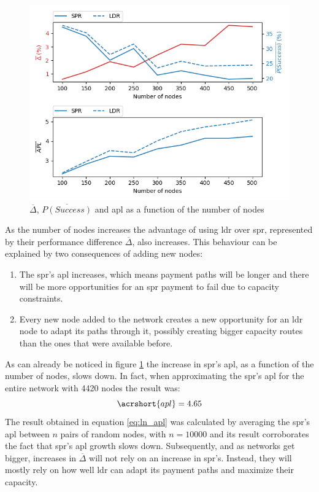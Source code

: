\begin{figure}[H]
\begin{center}
  \includegraphics[width=\linewidth]{images/simulation_results5.png}
  \caption{$\overline{\Delta}$, $\overline{P(Success)}$ and \acrshort{apl} as a function of the number of nodes}
  \label{fig:simulation_results5}
  \end{center}
\end{figure}

As the number of nodes increases the advantage of using \acrshort{ldr} over \acrshort{spr}, represented by their performance difference $\overline{\Delta}$, also increases. This behaviour can be explained by two consequences of adding new nodes:
\begin{enumerate}
	\item The \acrshort{spr}'s \acrshort{apl} increases, which means payment paths will be longer and there will be more opportunities for an \acrshort{spr} payment to fail due to capacity constraints.
	\item Every new node added to the network creates a new opportunity for an \acrshort{ldr} node to adapt its paths through it, possibly creating bigger capacity routes than the ones that were available before.
\end{enumerate}

As can already be noticed in figure \ref{fig:simulation_results5} the increase in \acrshort{spr}'s \acrshort{apl}, as a function of the number of nodes, slows down. In fact, when approximating the \acrshort{spr}'s \acrshort{apl} for the entire network with 4420 nodes the result was:
 \begin{equation}
     \acrshort{apl} = 4.65
\label{eq:ln_apl}
 \end{equation}
 The result obtained in equation \ref{eq:ln_apl} was calculated by averaging the \acrshort{spr}'s \acrshort{apl} between $n$ pairs of random nodes, with $n=10000$ and its result corroborates the fact that \acrshort{spr}'s \acrshort{apl} growth slows down. Subsequently, and as networks get bigger, increases in $\overline{\Delta}$ will not rely on an increase in \acrshort{spr}'s. Instead, they will mostly rely on how well \acrshort{ldr} can adapt its payment paths and maximize their capacity.\\ 